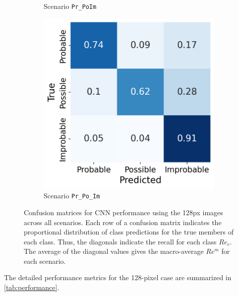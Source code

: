 \documentclass[Journal,letterpaper, SingleSpace, InsideFigs]{ascelike-new}
\begin{document}
\begin{figure}[ht]
\begin{subfigure}[t]{.25\linewidth}
    \caption{Scenario \texttt{Pr\_PoIm}}
    \label{pr_poim_cm}
\end{subfigure}%
  \begin{subfigure}[t]{.25\linewidth}
    \centering
    \includegraphics[width=\linewidth]{opt-confusion-matrix-Pr_Po_Im-128-px.png}
    \caption{Scenario \texttt{Pr\_Po\_Im}}
    \label{pr_po_im_cm}
  \end{subfigure}%
    \caption{Confusion matrices for CNN performance using the 128px images across all scenarios.
    Each row of a confusion matrix indicates the proportional distribution of class predictions for the true members of each class. Thus, the diagonals indicate the recall for each class $Re_c$. The average of the diagonal values gives the macro-average $Re^m$ for each scenario.}
    \label{fig:confusion-matrix}
  \end{figure}

  The detailed performance metrics for the 128-pixel case are summarized in \autoref{tab:performance}.
  
\end{document}
